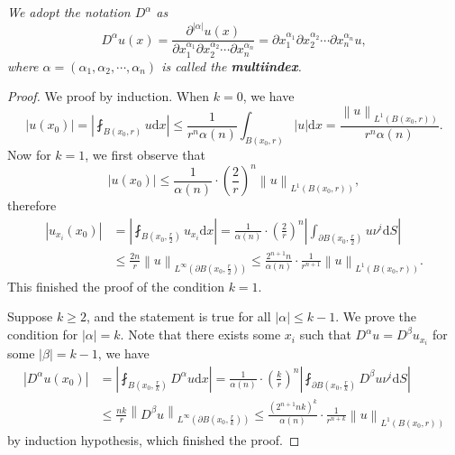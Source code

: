 \begin{note}\em
We adopt the notation $D^\alpha$ as 
$$
D^{\alpha}u\left( x \right) =\frac{\partial ^{\left| \alpha \right|}u\left( x \right)}{\partial x_{1}^{\alpha _1}\partial x_{2}^{\alpha _2}\cdots \partial x_{n}^{\alpha _n}}=\partial x_{1}^{\alpha _1}\partial x_{2}^{\alpha _2}\cdots \partial x_{n}^{\alpha _n}u,
$$
where $\alpha=(\alpha_1,\alpha_2,\cdots,\alpha_n)$ is called the \textbf{multiindex}.
\end{note}
\begin{proof}
We proof by induction. When $k=0$, we have 
$$
\left| u\left( x_0 \right) \right|=\left| \fint_{B\left( x_0,r \right)}{u\mathrm{d}x} \right|\le \frac{1}{r^n\alpha \left( n \right)}\int_{B\left( x_0,r \right)}{\left| u \right|\mathrm{d}x}=\frac{\left\| u \right\| _{L^1\left( B\left( x_0,r \right) \right)}}{r^n\alpha \left( n \right)}.
$$
Now for $k=1$, we first observe that 
$$
\left| u\left( x_0 \right) \right|\le \frac{1}{\alpha \left( n \right)}\cdot \left( \frac{2}{r} \right) ^n\left\| u \right\| _{L^1\left( B\left( x_0,r \right) \right)},
$$
therefore  
$$
\begin{aligned}
\left| u_{x_i}\left( x_0 \right) \right|&=\left| \fint_{B\left( x_0,\frac{r}{2} \right)}{u_{x_i}\mathrm{d}x} \right|=\frac{1}{\alpha \left( n \right)}\cdot \left( \frac{2}{r} \right) ^n\left| \int_{\partial B\left( x_0,\frac{r}{2} \right)}{u\nu ^i\mathrm{d}S} \right|
\\
&\le \frac{2n}{r}\left\| u \right\| _{L^{\infty}\left( \partial B\left( x_0,\frac{r}{2} \right) \right)}\le \frac{2^{n+1}n}{\alpha \left( n \right)}\cdot \frac{1}{r^{n+1}}\left\| u \right\| _{L^1\left( B\left( x_0,r \right) \right)}.
\end{aligned}
$$
This finished the proof of the condition $k=1$.\par
Suppose $k\ge 2$, and the statement is true for all $|\alpha|\le k-1$. We prove the condition for $|\alpha|=k$. Note that there exists some $x_i$ such that $D^\alpha u=D^\beta u_{x_i}$ for some $|\beta|=k-1$, we have 
$$
\begin{aligned}
\left| D^{\alpha}u\left( x_0 \right) \right|&=\left| \fint_{B\left( x_0,\frac{r}{k} \right)}{D^{\alpha}u\mathrm{d}x} \right|=\frac{1}{\alpha \left( n \right)}\cdot \left( \frac{k}{r} \right) ^n\left| \fint_{\partial B\left( x_0,\frac{r}{k} \right)}{D^{\beta}u\nu ^i\mathrm{d}S} \right|
\\
&\le \frac{nk}{r}\left\| D^{\beta}u \right\| _{L^{\infty}\left( \partial B\left( x_0,\frac{r}{k} \right) \right)}\le \frac{\left( 2^{n+1}nk \right) ^k}{\alpha \left( n \right)}\cdot \frac{1}{r^{n+k}}\left\| u \right\| _{L^1\left( B\left( x_0,r \right) \right)}
\end{aligned}
$$
by induction hypothesis, which finished the proof.
\end{proof}
